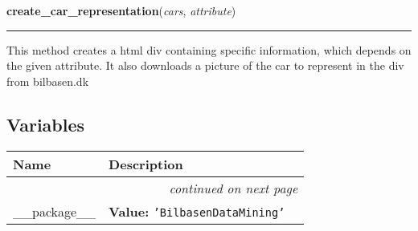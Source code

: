     \label{BilbasenDataMining:html:create_car_representation}

    \vspace{0.5ex}

\hspace{.8\funcindent}\begin{boxedminipage}{\funcwidth}

    \raggedright \textbf{create\_car\_representation}(\textit{cars}, \textit{attribute})

    \vspace{-1.5ex}

    \rule{\textwidth}{0.5\fboxrule}
\setlength{\parskip}{2ex}
    This method creates a html div containing specific information, which 
    depends on the given attribute. It also downloads a picture of the car 
    to represent in the div from bilbasen.dk

\setlength{\parskip}{1ex}
    \end{boxedminipage}



  \subsection{Variables}

    \vspace{-1cm}
\hspace{\varindent}\begin{longtable}{|p{\varnamewidth}|p{\vardescrwidth}|l}
\cline{1-2}
\cline{1-2} \centering \textbf{Name} & \centering \textbf{Description}& \\
\cline{1-2}
\endhead\cline{1-2}\multicolumn{3}{r}{\small\textit{continued on next page}}\\\endfoot\cline{1-2}
\endlastfoot\raggedright \_\-\_\-p\-a\-c\-k\-a\-g\-e\-\_\-\_\- & \raggedright \textbf{Value:} 
{\tt \texttt{'}\texttt{BilbasenDataMining}\texttt{'}}&\\
\cline{1-2}
\end{longtable}

